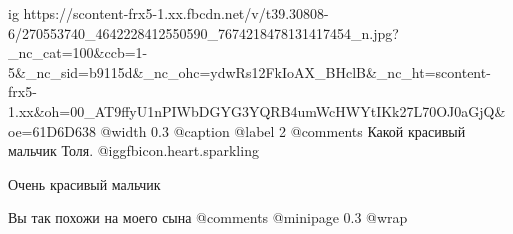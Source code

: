  
 
 
 
 

\ifcmt
  ig https://scontent-frx5-1.xx.fbcdn.net/v/t39.30808-6/270553740_4642228412550590_7674218478131417454_n.jpg?_nc_cat=100&ccb=1-5&_nc_sid=b9115d&_nc_ohc=ydwRs12FkIoAX_BHclB&_nc_ht=scontent-frx5-1.xx&oh=00_AT9ffyU1nPIWbDGYG3YQRB4umWcHWYtIKk27L70OJ0aGjQ&oe=61D6D638
  @width 0.3
	@caption @label 2
  @comments%
		Какой красивый мальчик Толя. @igg{fbicon.heart.sparkling} 
		
		Очень красивый мальчик

    Вы так похожи на моего сына
  @comments%
  @minipage 0.3
  @wrap \parpic[r]
\fi


